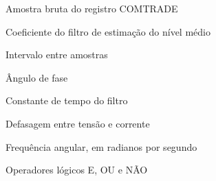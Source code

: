 \documentclass[
  12pt,
  oneside,
  a4paper,
  brazil,
  sumario=tradicional
]{abntex2}
\begin{document}
\begin{simbolos}
  \item[$x_{\mathrm{raw}}$] Amostra bruta do registro COMTRADE
  \item[$\alpha$] Coeficiente do filtro de estimação do nível médio
  \item[$\Delta t$] Intervalo entre amostras
  \item[$\theta$] Ângulo de fase
  \item[$\tau$] Constante de tempo do filtro
  \item[$\varphi$] Defasagem entre tensão e corrente
  \item[$\omega$] Frequência angular, em radianos por segundo
  \item[$\land$, $\lor$, $\neg$] Operadores lógicos E, OU e NÃO
\end{simbolos}
\thispagestyle{pretextualnumerado}
\cleardoublepage

\tableofcontents*
\thispagestyle{pretextualnumerado}
\cleardoublepage

\textual
{}









\postextual




\appendix
\renewcommand{\chaptername}{Apêndice}

\end{document}
